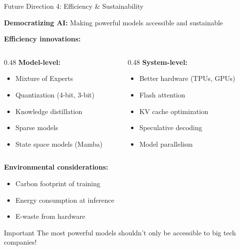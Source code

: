 \documentclass[aspectratio=169]{beamer}
\begin{document}
\begin{frame}[shrink=10]{Future Direction 4: Efficiency \& Sustainability 🌱}
\begin{futurebox}
\textbf{Democratizing AI:} Making powerful models accessible and sustainable
\end{futurebox}

\textbf{Efficiency innovations:}
\begin{columns}[T]
\begin{column}{0.48\textwidth}
\textbf{Model-level:}
\begin{itemize}\setlength{\itemsep}{0pt}
    \item Mixture of Experts
    \item Quantization (4-bit, 3-bit)
    \item Knowledge distillation
    \item Sparse models
    \item State space models (Mamba)
\end{itemize}
\end{column}

\begin{column}{0.48\textwidth}
\textbf{System-level:}
\begin{itemize}\setlength{\itemsep}{0pt}
    \item Better hardware (TPUs, GPUs)
    \item Flash attention
    \item KV cache optimization
    \item Speculative decoding
    \item Model parallelism
\end{itemize}
\end{column}
\end{columns}

\vspace{0.5em}

\textbf{Environmental considerations:}
\begin{itemize}\setlength{\itemsep}{0pt}
    \item Carbon footprint of training
    \item Energy consumption at inference
    \item E-waste from hardware
\end{itemize}

\vspace{0.5em}

\begin{alertblock}{Important}
The most powerful models shouldn't only be accessible to big tech companies!
\end{alertblock}
\end{frame}
\end{document}
